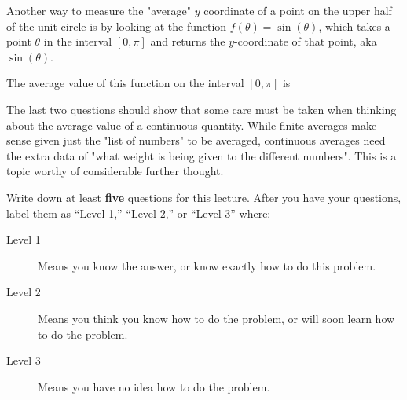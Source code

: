 \documentclass{ximera}
\begin{document}
\begin{question}
	Another way to measure the "average" $y$ coordinate of a point on the upper half of the unit circle is by looking at the function $f(\theta) = \sin(\theta) $, which takes a point $\theta$ in the interval $[0,\pi]$ and returns the $y$-coordinate of that point, aka $\sin(\theta)$.
	
	The average value of this function on the interval $[0,\pi]$ is 

\end{question}

The last two questions should show that some care must be taken when thinking about the average value of a continuous quantity.  While finite averages make sense given just the "list of numbers" to be averaged, continuous averages need the extra data of "what weight is being given to the different numbers".  This is a topic worthy of considerable further thought.

Write down at least \textbf{five} questions for this lecture. After
you have your questions, label them as ``Level 1,'' ``Level 2,'' or ``Level 3'' where:
\begin{description}
\item[Level 1] Means you know the answer, or know exactly how to do this problem.
\item[Level 2] Means you think you know how to do the problem, or will soon learn how to do the problem.
\item[Level 3] Means you have no idea how to do the problem. 
\end{description}
\begin{question}
  \begin{freeResponse}
  \end{freeResponse}
\end{question}
\end{document}
